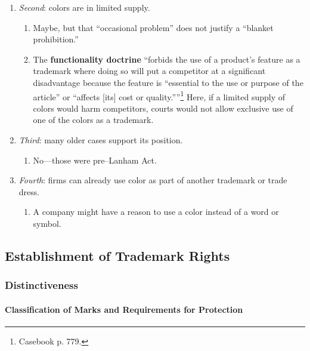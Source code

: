 \begin{enumerate}
\begin{enumerate}
\begin{enumerate}
        \end{enumerate}
        \item \emph{Second}: colors are in limited supply.
        \begin{enumerate}
            \item Maybe, but that ``occasional problem'' does not justify a 
            ``blanket prohibition.'' 
            \item The \textbf{functionality doctrine} ``forbids the use of a 
            product's feature as a trademark where doing so will put a 
            competitor at a significant disadvantage because the feature is 
            \enquote{essential to the use or purpose of the article} or 
            \enquote{affects [its] cost or quality.}''\footnote{Casebook p. 
            779.} Here, if a limited supply of colors would harm competitors, 
            courts would not allow exclusive use of one of the colors as a 
            trademark.
        \end{enumerate}
        \item \emph{Third}: many older cases support its position.
        \begin{enumerate}
            \item No---those were pre--Lanham Act.
        \end{enumerate}
        \item \emph{Fourth}: firms can already use color as part of another 
        trademark or trade dress.
        \begin{enumerate}
            \item A company might have a reason to use a color instead of a 
            word or symbol.
        \end{enumerate}
    \end{enumerate}
\end{enumerate}

\subsection{Establishment of Trademark Rights}

\subsubsection{Distinctiveness}

\paragraph{Classification of Marks and Requirements for Protection}

